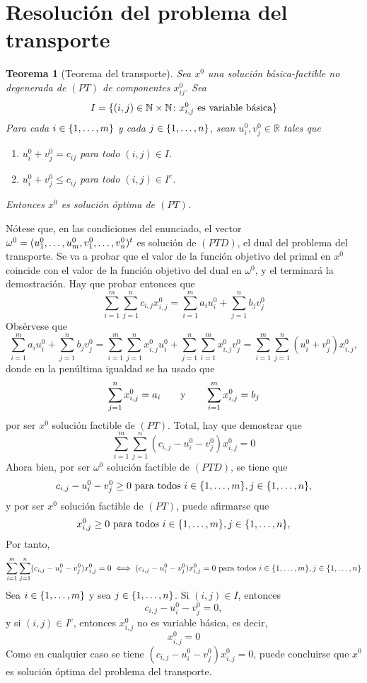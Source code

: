\documentclass[11pt]{report}
\makeatletter
\renewenvironment{proof}[1][\proofname]{\par
  \pushQED{\qed}%
  \normalfont \topsep\z@skip %
  \trivlist
  \item[\hskip\labelsep
        \itshape
    #1\@addpunct{.}]\ignorespaces
}{%
  \popQED\endtrivlist\@endpefalse
}
\theoremstyle{mytheorem}
\newtheorem{theorem}{Teorema}
\theoremstyle{mydefinition}
\theoremstyle{myexample}
\let\oldproofname=\proofname
\renewcommand{\proofname}{\rm\bf{\oldproofname}}}
\newenvironment{ctheorem} %
  {\begin{mdframed}[
        linewidth=3pt,
        linecolor=c2,
        bottomline=false,
        topline=false,
        rightline=false,
        innerrightmargin=0pt,
        innertopmargin=0pt,
        innerbottommargin=0pt,
        innerleftmargin=1em,
        skipabove=\baselineskip]
    \begin{theorem}}
  {\end{theorem}\end{mdframed}}
\newcommand{\R}{\mathbb R}
\newcommand{\N}{\mathbb N}
\makeatother
\begin{document}
\section{Resolución del problema del transporte}

\begin{ctheorem}[Teorema del transporte]
Sea $x^0$ una solución básica-factible no degenerada de $(PT)$ de componentes $x^0_{ij}$. Sea
\[I = \{(i,j) \in \N \times \N \colon x^0_{i,j} \textup{ es variable básica}\}\]
Para cada $i \in \{1,\mathellipsis,m\}$ y cada $j \in \{1,\mathellipsis,n\}$, sean $u^0_i,v^0_j \in \R$ tales que
\begin{enumerate}
    \item $u_i^0+v_j^0=c_{ij}$ para todo $(i,j) \in I$.
    \item $u^0_i+v_j^0 \leq c_{ij}$ para todo $(i,j) \in I^c$.
\end{enumerate}
Entonces $x^0$ es solución óptima de $(PT)$.
\end{ctheorem}

\begin{proof}
Nótese que, en las condiciones del enunciado, el vector $\omega^0 = (u_1^0,\mathellipsis,u_m^0,v_1^0,\mathellipsis,v_n^0)^t$ es solución de $(PTD)$, el dual del problema del transporte. Se va a probar que el valor de la función objetivo del primal en $x^0$ coincide con el valor de la función objetivo del dual en $\omega^0$, y el \hyperref[cor3.1.]{\color{gray}{Corolario 3}} terminará la demostración. Hay que probar entonces que
\[\sum_{i=1}^m\sum_{j=1}^nc_{i,j}x_{i,j}^0 = \sum_{i=1}^m a_iu_i^0+\sum_{j=1}^nb_jv_j^0\]
Obsérvese que
\[\sum_{i=1}^m a_iu_i^0+\sum_{j=1}^nb_jv_j^0 = \sum_{i=1}^m \sum_{j=1}^nx_{i,j}^0u_i^0+\sum_{j=1}^n\sum_{i=1}^mx_{i,j}^0v_j^0 = \sum_{i=1}^m\sum_{j=1}^n(u_i^0+v_j^0)x^0_{i,j},\]
donde en la penúltima igualdad se ha usado que
\[\sum_{j=1}^n x_{i,j}^0 = a_i \qquad \textup{y} \qquad \sum_{i=1}^m x_{i,j}^0 = b_j\]
por ser $x^0$ solución factible de $(PT)$. Total, hay que demostrar que
\[\sum_{i= 1}^m\sum_{j=1}^n(c_{i,j}-u^0_i-v^0_j)x^0_{i,j} = 0\]
Ahora bien, por ser $\omega^0$ solución factible de $(PTD)$, se tiene que
\[c_{i,j}-u^0_i-v^0_j \geq 0 \textup{ para todos } i \in \{1,\mathellipsis,m\}, j \in \{1,\mathellipsis,n\},\]
y por ser $x^0$ solución factible de $(PT)$, puede afirmarse que
\[x^0_{i,j} \geq 0 \textup{ para todos } i \in \{1,\mathellipsis,m\},j \in \{1,\mathellipsis,n\},\]
Por tanto,
\[\sum_{i= 1}^m\sum_{j=1}^n(c_{i,j}-u^0_i-v^0_j)x^0_{i,j} = 0 \iff (c_{i,j}-u^0_i-v^0_j)x^0_{i,j} =0\textup{ para todos } i \in \{1,\mathellipsis,m\}, j \in \{1,\mathellipsis,n\}\]
Sea $i \in \{1,\mathellipsis,m\}$ y sea $j \in \{1,\mathellipsis,n\}$. Si $(i,j) \in I$, entonces
\[c_{i,j}-u^0_i-v^0_j = 0,\]
y si $(i,j) \in I^c$, entonces $x^0_{i,j}$ no es variable básica, es decir,
\[x^0_{i,j} = 0\]
Como en cualquier caso se tiene $(c_{i,j}-u^0_i-v^0_j)x^0_{i,j} = 0$, puede concluirse que $x^0$ es solución óptima del problema del transporte.
\end{proof}
\end{document}
